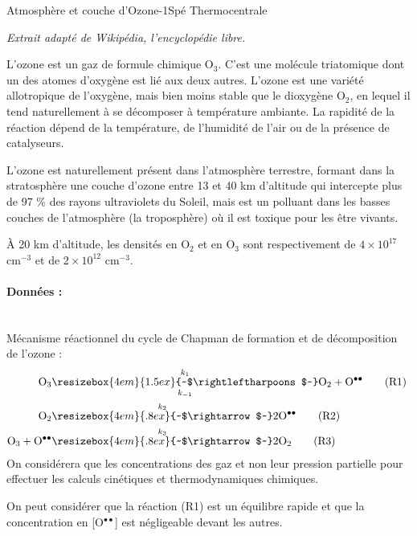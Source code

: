 \begin{exercise}{Atmosphère et couche d'Ozone}{-1}{Spé}
{Thermo}{centrale}

\textsl{Extrait adapté de Wikipédia, l'encyclopédie libre.}

\begin{center}\begin{minipage}{.9\textwidth}
L'ozone est un gaz de formule chimique O$_3$. C'est une molécule triatomique dont un des atomes d'oxygène est lié aux deux autres. L'ozone est une variété allotropique de l'oxygène, mais bien moins stable que le dioxygène O$_2$, en lequel il tend naturellement à se décomposer à température ambiante. La rapidité de la réaction dépend de la température, de l'humidité de l'air ou de la présence de catalyseurs.

L'ozone est naturellement présent dans l'atmosphère terrestre, formant dans la stratosphère une couche d'ozone entre 13 et 40 km d'altitude qui intercepte plus de 97 \% des rayons ultraviolets du Soleil, mais est un polluant dans les basses couches de l'atmosphère (la troposphère) où il est toxique pour les être vivants.

\`A 20 km d'altitude, les densités en O$_2$ et en O$_3$ sont respectivement de $4\times 10^{17}$ cm$^{-3}$ et de $2\times 10^{12}$ cm$^{-3}$.
\end{minipage}\end{center}

\paragraph{Données :}~\\
Mécanisme réactionnel du cycle de Chapman de formation et de décomposition de l'ozone :
\begin{align}
    \mathrm{O_3} & \underset{k_{-1}}{\overset{k_1}{\resizebox{4em}{1.5ex}{~$\rightleftharpoons$~}}} \mathrm{O_2 + O^{\bullet\bullet}} \tag{R1} \ \\
    \mathrm{O_2} & \overset{k_2}{\resizebox{4em}{.8ex}{~$\rightarrow$~}} \mathrm{2O^{\bullet\bullet}} \tag{R2}
    \\
    \mathrm{O_3 + O^{\bullet\bullet}} & \overset{k_3}{\resizebox{4em}{.8ex}{~$\rightarrow$~}} \mathrm{2O_2} \tag{R3}
\end{align}
On considérera que les concentrations des gaz et non leur pression partielle pour effectuer les calculs cinétiques et thermodynamiques chimiques.

On peut considérer que la réaction (R1) est un équilibre rapide et que la concentration en [O$^{\bullet\bullet}$] est négligeable devant les autres.


\end{exercise}
